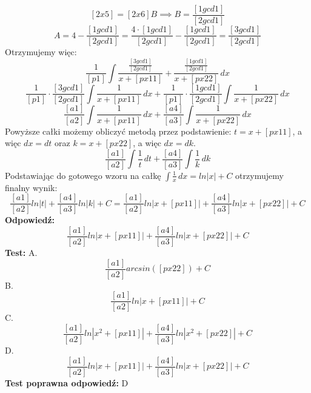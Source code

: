 \documentclass[12pt, a4paper]{article}
\theoremstyle{definition} %
\newcommand{\rozwStop}{\newline}                                            %
\newcommand{\odpStart}{\noindent \textbf{Odpowiedź:}\newline}    %
\newcommand{\odpStop}{\newline}                                             %
\newcommand{\testStart}{\noindent \textbf{Test:}\newline} %
\newcommand{\testStop}{\newline} %
\newcommand{\kluczStart}{\noindent \textbf{Test poprawna odpowiedź:}\newline} %
\newcommand{\kluczStop}{\newline} %
\begin{document}
$$[2x5]=[2x6]B\implies B=\frac{[1gcd1]}{[2gcd1]}$$
$$A=4-\frac{[1gcd1]}{[2gcd1]}=\frac{4\cdot[1gcd1]}{[2gcd1]}-\frac{[1gcd1]}{[2gcd1]}=\frac{[3gcd1]}{[2gcd1]}$$
Otrzymujemy więc:
$$\frac{1}{[p1]}\int \frac{\frac{[3gcd1]}{[2gcd1]}}{x+[px11]}+\frac{\frac{[1gcd1]}{[2gcd1]}}{x+[px22]} \,dx$$
$$\frac{1}{[p1]}\cdot\frac{[3gcd1]}{[2gcd1]}\int \frac{1}{x+[px11]} \,dx+\frac{1}{[p1]}\cdot\frac{[1gcd1]}{[2gcd1]}\int \frac{1}{x+[px22]} \,dx$$
$$\frac{[a1]}{[a2]}\int \frac{1}{x+[px11]} \,dx+\frac{[a4]}{[a3]}\int \frac{1}{x+[px22]} \,dx$$
Powyższe całki możemy obliczyć metodą przez podstawienie: $t=x+[px11]$, a więc $dx=dt$ oraz $k=x+[px22]$, a więc $dx=dk$.
$$\frac{[a1]}{[a2]}\int \frac{1}{t} \,dt+\frac{[a4]}{[a3]}\int \frac{1}{k} \,dk$$
Podstawiając do gotowego wzoru na całkę $\int \frac{1}{x} \,dx=ln|x|+C$ otrzymujemy finalny wynik:
$$\frac{[a1]}{[a2]}ln|t|+\frac{[a4]}{[a3]}ln|k|+C=\frac{[a1]}{[a2]}ln|x+[px11]|+\frac{[a4]}{[a3]}ln|x+[px22]|+C$$
\rozwStop
\odpStart
$$\frac{[a1]}{[a2]}ln|x+[px11]|+\frac{[a4]}{[a3]}ln|x+[px22]|+C$$
\odpStop
\testStart
A.$$\frac{[a1]}{[a2]}arcsin([px22])+C$$
B.$$\frac{[a1]}{[a2]}ln|x+[px11]|+C$$
C.$$\frac{[a1]}{[a2]}ln|x^2+[px11]|+\frac{[a4]}{[a3]}ln|x^2+[px22]|+C$$
D.$$\frac{[a1]}{[a2]}ln|x+[px11]|+\frac{[a4]}{[a3]}ln|x+[px22]|+C$$
\testStop
\kluczStart
D
\kluczStop
\end{document}
